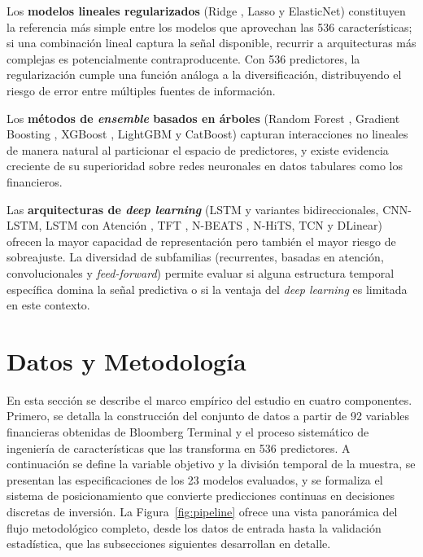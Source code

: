 ﻿\documentclass[11pt,a4paper]{article}
\begin{document}
Los \textbf{modelos lineales regularizados} (Ridge \citep{hoerl1970}, Lasso \citep{tibshirani1996} y ElasticNet) constituyen la referencia m\'as simple entre los modelos que aprovechan las 536 caracter\'isticas; si una combinaci\'on lineal captura la se\~nal disponible, recurrir a arquitecturas m\'as complejas es potencialmente contraproducente. Con 536 predictores, la regularizaci\'on cumple una funci\'on an\'aloga a la diversificaci\'on, distribuyendo el riesgo de error entre m\'ultiples fuentes de informaci\'on.

Los \textbf{m\'etodos de \textit{ensemble} basados en \'arboles} (Random Forest \citep{breiman2001}, Gradient Boosting \citep{friedman2001}, XGBoost \citep{chen2016}, LightGBM y CatBoost) capturan interacciones no lineales de manera natural al particionar el espacio de predictores, y existe evidencia creciente de su superioridad sobre redes neuronales en datos tabulares como los financieros.

Las \textbf{arquitecturas de \textit{deep learning}} (LSTM \citep{hochreiter1997,gers2000} y variantes bidireccionales, CNN-LSTM, LSTM con Atenci\'on \citep{vaswani2017}, TFT \citep{lim2021}, N-BEATS \citep{oreshkin2020}, N-HiTS, TCN y DLinear) ofrecen la mayor capacidad de representaci\'on pero tambi\'en el mayor riesgo de sobreajuste. La diversidad de subfamilias (recurrentes, basadas en atenci\'on, convolucionales y \textit{feed-forward}) permite evaluar si alguna estructura temporal espec\'ifica domina la se\~nal predictiva o si la ventaja del \textit{deep learning} es limitada en este contexto.

\section{Datos y Metodolog\'ia}

En esta secci\'on se describe el marco emp\'irico del estudio en cuatro componentes. Primero, se detalla la construcci\'on del conjunto de datos a partir de 92 variables financieras obtenidas de Bloomberg Terminal y el proceso sistem\'atico de ingenier\'ia de caracter\'isticas que las transforma en 536 predictores. A continuaci\'on se define la variable objetivo y la divisi\'on temporal de la muestra, se presentan las especificaciones de los 23 modelos evaluados, y se formaliza el sistema de posicionamiento que convierte predicciones continuas en decisiones discretas de inversi\'on. La Figura~\ref{fig:pipeline} ofrece una vista panor\'amica del flujo metodol\'ogico completo, desde los datos de entrada hasta la validaci\'on estad\'istica, que las subsecciones siguientes desarrollan en detalle.
\end{document}
